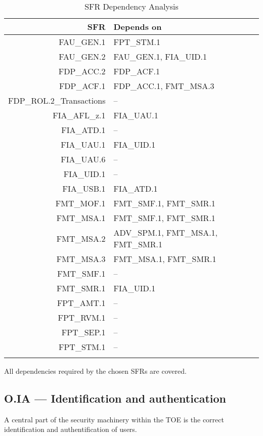 \documentclass[12pt,english]{scrbook}
\begin{document}
\begin{longtable}{rp{8cm}}
        \toprule
        SFR                 &   Depends on  \\
        \midrule\endhead
FAU\_GEN.1                  &   FPT\_STM.1   \\
FAU\_GEN.2                  &   FAU\_GEN.1, FIA\_UID.1 \\
FDP\_ACC.2                  &   FDP\_ACF.1 \\
FDP\_ACF.1                  &   FDP\_ACC.1, FMT\_MSA.3 \\
FDP\_ROL.2\_Transactions    &   -- \\
FIA\_AFL\_z.1               &   FIA\_UAU.1 \\
FIA\_ATD.1                  &   -- \\
FIA\_UAU.1                  &   FIA\_UID.1 \\
FIA\_UAU.6                  &   -- \\
FIA\_UID.1                  &   -- \\
FIA\_USB.1                  &   FIA\_ATD.1 \\
FMT\_MOF.1                  &   FMT\_SMF.1, FMT\_SMR.1 \\
FMT\_MSA.1                  &   FMT\_SMF.1, FMT\_SMR.1 \\
FMT\_MSA.2                  &   ADV\_SPM.1, FMT\_MSA.1, FMT\_SMR.1 \\
FMT\_MSA.3                  &   FMT\_MSA.1, FMT\_SMR.1 \\
FMT\_SMF.1                  &   -- \\
FMT\_SMR.1                  &   FIA\_UID.1 \\
FPT\_AMT.1                  &   -- \\
FPT\_RVM.1                  &   -- \\
FPT\_SEP.1                  &   -- \\
FPT\_STM.1                  &   -- \\
\bottomrule
   \caption{SFR Dependency Analysis}
\end{longtable}

All dependencies required by the chosen SFRs are covered. 

\subsection{O.IA --- Identification and authentication}

    A central part of the security machinery within the TOE is the correct
    identification and authentification of users.
\end{document}

